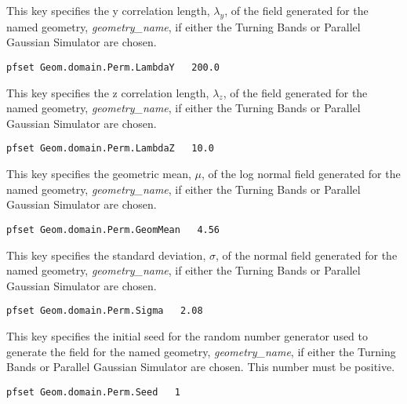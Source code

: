 {
This key specifies the y correlation length, $\lambda_y$, of the field
generated for the named geometry, {\em geometry\_name}, if either the
Turning Bands or Parallel Gaussian Simulator are chosen.
}
\begin{display}\begin{verbatim}
pfset Geom.domain.Perm.LambdaY   200.0
\end{verbatim}\end{display}

{
This key specifies the z correlation length, $\lambda_z$, of the field
generated for the named geometry, {\em geometry\_name}, if either the
Turning Bands or Parallel Gaussian Simulator are chosen.
}
\begin{display}\begin{verbatim}
pfset Geom.domain.Perm.LambdaZ   10.0
\end{verbatim}\end{display}

{
This key specifies the geometric mean, $\mu$, of the log normal field
generated for the named geometry, {\em geometry\_name}, if either the
Turning Bands or Parallel Gaussian Simulator are chosen.
}
\begin{display}\begin{verbatim}
pfset Geom.domain.Perm.GeomMean   4.56
\end{verbatim}\end{display}

{
This key specifies the standard deviation, $\sigma$, of the normal field
generated for the named geometry, {\em geometry\_name}, if either the
Turning Bands or Parallel Gaussian Simulator are chosen.
}
\begin{display}\begin{verbatim}
pfset Geom.domain.Perm.Sigma   2.08
\end{verbatim}\end{display}

{
This key specifies the initial seed for the random number generator used
to generate the field for the named geometry, {\em geometry\_name}, if
either the Turning Bands or Parallel Gaussian Simulator are chosen.
This number must be positive.
}
\begin{display}\begin{verbatim}
pfset Geom.domain.Perm.Seed   1
\end{verbatim}\end{display}

